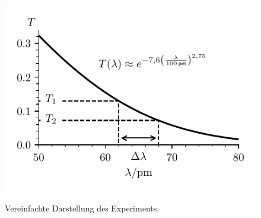 \documentclass[ngerman,a4paper,twocolumn,twoside]{scrartcl}
\begin{document}
\begin{figure}[h!]
\centering
\\
\includegraphics{plot.pdf}
\caption{Vereinfachte Darstellung des Experiments.}
\end{figure}
\end{document}
